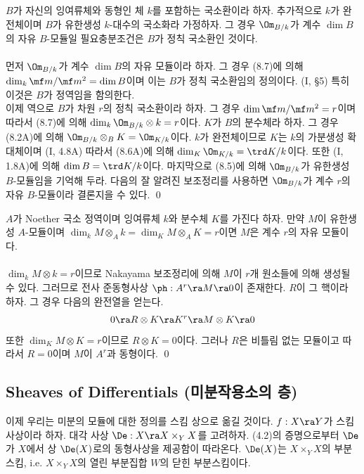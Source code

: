 	
	\begin{theorem}
	$B$가 자신의 잉여류체와 동형인 체 $k$를 포함하는 국소환이라 하자.
	추가적으로 $k$가 완전체이며 $B$가 유한생성 $k$-대수의 국소화라 가정하자.
	그 경우 $\Om_{B/k}$가 계수 $\dim B$의 자유 $B$-모듈일 필요충분조건은 $B$가 정칙 국소환인 것이다.\\\\
	\pf 먼저 $\Om_{B/k}$가 계수 $\dim B$의 자유 모듈이라 하자. 그 경우 (8.7)에 의해 $\dim_k\mf m/\mf m^2=\dim B$이며
	이는 $B$가 정칙 국소환임의 정의이다. (I, \S 5) 특히 이것은 $B$가 정역임을 함의한다.\\
	이제 역으로 $B$가 차원 $r$의 정칙 국소환이라 하자.
	그 경우 $\dim\mf m/\mf m^2=r$이며 따라서 (8.7)에 의해 $\dim_k\Om_{B/k}\otimes k=r$이다.
	$K$가 $B$의 분수체라 하자. 그 경우 (8.2A)에 의해 $\Om_{B/k}\otimes_BK=\Om_{K/k}$이다.
	$k$가 완전체이므로 $K$는 $k$의 가분생성 확대체이며 (I, 4.8A) 따라서 (8.6A)에 의해 $\dim_K\Om_{K/k}=\trd K/k$이다.
	또한 (I, 1.8A)에 의해 $\dim B=\trd K/k$이다.
	마지막으로 (8.5)에 의해 $\Om_{B/k}$가 유한생성 $B$-모듈임을 기억해 두라.
	다음의 잘 알려진 보조정리를 사용하면 $\Om_{B/k}$가 계수 $r$의 자유 $B$-모듈이라 결론지을 수 있다.
	\qed
	\end{theorem}
	
	
	\begin{lemma}
	$A$가 Noether 국소 정역이며 잉여류체 $k$와 분수체 $K$를 가진다 하자.
	만약 $M$이 유한생성 $A$-모듈이며 $\dim_kM\otimes_Ak=\dim_KM\otimes_AK=r$이면 $M$은 계수 $r$의 자유 모듈이다.\\\\
	\pf $\dim_kM\otimes k=r$이므로 Nakayama 보조정리에 의해 $M$이 $r$개 원소들에 의해 생성될 수 있다.
	그러므로 전사 준동형사상 $\ph:A^r\ra M\ra 0$이 존재한다.
	$R$이 그 핵이라 하자. 그 경우 다음의 완전열을 얻는다.
	$$0\ra R\otimes K\ra K^r\ra M\otimes K\ra 0$$
	또한 $\dim_KM\otimes K=r$이므로 $R\otimes K=0$이다. 그러나 $R$은 비틀림 없는 모듈이고 따라서 $R=0$이며 $M$이 $A^r$과 동형이다.
	\qed
	\end{lemma}
	
	
	\subsection*{Sheaves of Differentials (미분작용소의 층)}
	이제 우리는 미분의 모듈에 대한 정의를 스킴 상으로 옮길 것이다.
	$f:X\ra Y$가 스킴 사상이라 하자. 대각 사상 $\De:X\ra X\times_YX$를 고려하자.
	(4.2)의 증명으로부터 $\De$가 $X$에서 상 $\De(X)$로의 동형사상을 제공함이 따라온다.
	$\De(X)$는 $X\times_YX$의  부분스킴, i.e. $X\times_YX$의 열린 부분집합 $W$의 닫힌 부분스킴이다.
	
